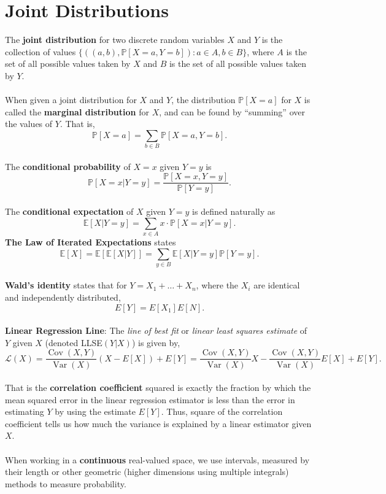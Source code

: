 \documentclass{article}
\theoremstyle{definition}
\DeclareMathOperator{\Var}{Var}
\DeclareMathOperator{\Cov}{Cov}
\begin{document}
\section*{Joint Distributions}
The \textbf{joint distribution} for two discrete random variables $X$ and $Y$ is the collection of values $\{((a,b),\mathbb{P}[X = a,Y = b]) : a \in A, b \in B\}$, where $A$ is the set of all possible values taken by $X$ and $B$ is the set of all possible values taken by $Y$. \\ \\
When given a joint distribution for $X$ and $Y$, the distribution $\mathbb{P}[X = a]$ for $X$ is called the \textbf{marginal distribution} for $X$, and can be found by “summing” over the values of $Y$. That is, $$\mathbb{P}[X = a] = \sum_{b \in B}\mathbb{P}[X = a, Y = b].$$ \\
The \textbf{conditional probability} of $X = x$ given $Y = y$ is $$\mathbb{P}[X = x | Y = y] = \frac{\mathbb{P}[X = x,Y = y]}{\mathbb{P}[Y = y]}.$$ \\
The \textbf{conditional expectation} of $X$ given $Y = y$ is defined naturally as $$\mathbb{E}[X | Y = y] = \sum_{x \in A}x \cdot \mathbb{P}[X = x | Y = y].$$
\textbf{The Law of Iterated Expectations} states $$\mathbb{E}[X] = \mathbb{E}[\mathbb{E}[X | Y]] = \sum_{y \in B} \mathbb{E}[X | Y = y]\mathbb{P}[Y = y].$$ \\
\textbf{Wald’s identity} states that for $Y = X_1 + \dots + X_n$, where the $X_i$ are identical and independently distributed, $$E[Y] = E[X_1]E[N].$$ \\
\textbf{Linear Regression Line}: The \textit{line of best fit} or \textit{linear least squares estimate} of $Y$ given $X$ (denoted LLSE$(Y | X)$) is given by, $$\mathcal{L}(X) = \frac{\Cov(X,Y)}{\Var(X)}(X - E[X]) + E[Y] = \frac{\Cov(X,Y)}{\Var(X)}X - \frac{\Cov(X,Y)}{\Var(X)}E[X] + E[Y].$$ \\
That is the \textbf{correlation coefficient} squared is exactly the fraction by which the mean squared error in the linear regression estimator is less than the error in estimating $Y$ by using the estimate $E[Y]$. Thus, square of
the correlation coefficient tells us how much the variance is explained by a linear estimator given $X$. \\ \\
When working in a \textbf{continuous} real-valued space, we use intervals, measured by their length or other geometric (higher dimensions using multiple integrals) methods to measure probability. \\ \\
\end{document}
